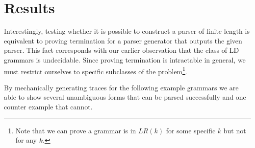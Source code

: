 \documentclass[envcountsame,runningheads]{llncs}
\begin{document}
\section{Results}

Interestingly, testing whether it is possible to construct a parser of finite length is equivalent to proving termination for a parser generator that outputs the given parser.
This fact corresponds with our earlier observation that the class of LD grammars is undecidable.
Since proving termination is intractable in general, we must restrict ourselves to specific subclasses of the problem\footnote{Note that we can prove a grammar is in $LR(k)$ for some specific $k$ but not for any $k$.}.


By mechanically generating traces for the following example grammars we are able to show several unambiguous forms that can be parsed successfully and one counter example that cannot.
\end{document}
